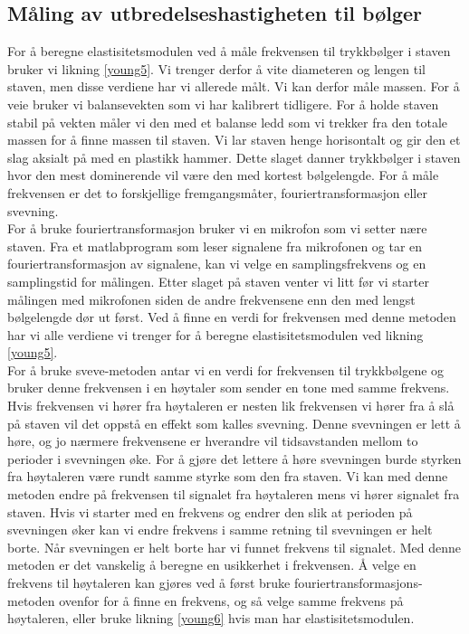\documentclass[%
 reprint,
 amsmath,amssymb,
 aps,
 norsk,
 booktabs
]{revtex4-1}
\begin{document}
\subsection{Måling av utbredelseshastigheten til bølger}
For å beregne elastisitetsmodulen ved å måle frekvensen til trykkbølger i staven bruker vi likning \eqref{young5}. Vi trenger derfor å vite diameteren og lengen til staven, men disse verdiene har vi allerede målt. Vi kan derfor måle massen. For å veie bruker vi balansevekten som vi har kalibrert tidligere. For å holde staven stabil på vekten måler vi den med et balanse ledd som vi trekker fra den totale massen for å finne massen til staven. Vi lar staven henge horisontalt og gir den et slag aksialt på med en plastikk hammer. Dette slaget danner trykkbølger i staven hvor den mest dominerende vil være den med kortest bølgelengde. For å måle frekvensen er det to forskjellige fremgangsmåter, fouriertransformasjon eller svevning.\\
For å bruke fouriertransformasjon bruker vi en mikrofon som vi setter nære staven. Fra et matlabprogram som leser signalene fra mikrofonen og tar en fouriertransformasjon av signalene, kan vi velge en samplingsfrekvens og en samplingstid for målingen. Etter slaget på staven venter vi litt før vi starter målingen med mikrofonen siden de andre frekvensene enn den med lengst bølgelengde dør ut først. Ved å finne en verdi for frekvensen med denne metoden har vi alle verdiene vi trenger for å beregne elastisitetsmodulen ved likning \eqref{young5}.\\
For å bruke sveve-metoden antar vi en verdi for frekvensen til trykkbølgene og bruker denne frekvensen i en høytaler som sender en tone med samme frekvens. Hvis frekvensen vi hører fra høytaleren er nesten lik frekvensen vi hører fra å slå på staven vil det oppstå en effekt som kalles svevning. Denne svevningen er lett å høre, og jo nærmere frekvensene er hverandre vil tidsavstanden mellom to perioder i svevningen øke. For å gjøre det lettere å høre svevningen burde styrken fra høytaleren være rundt samme styrke som den fra staven. Vi kan med denne metoden endre på frekvensen til signalet fra høytaleren mens vi hører signalet fra staven. Hvis vi starter med en frekvens og endrer den slik at perioden på svevningen øker kan vi endre frekvens i samme retning til svevningen er helt borte. Når svevningen er helt borte har vi funnet frekvens til signalet. Med denne metoden er det vanskelig å beregne en usikkerhet i frekvensen. Å velge en frekvens til høytaleren kan gjøres ved å først bruke fouriertransformasjons-metoden ovenfor for å finne en frekvens, og så velge samme frekvens på høytaleren, eller bruke likning \eqref{young6} hvis man har elastisitetsmodulen.
\end{document}
